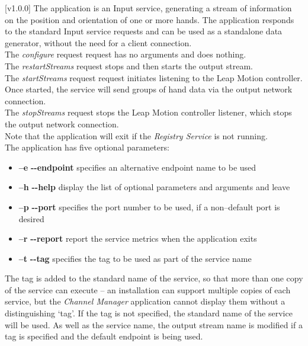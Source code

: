 [v1.0.0]
The  application is an Input service,
generating a stream of information on the position and orientation of one or more hands.
The application responds to the standard Input service requests and can be used as a
standalone data generator, without the need for a client connection.\\

The \emph{configure} request request has no arguments and does nothing.\\

The \emph{restartStreams} request stops and then starts the output stream.\\

The \emph{startStreams} request request initiates listening to the Leap Motion controller.
Once started, the service will send groups of hand data via the output \yarp{} network
connection.\\

The \emph{stopStreams} request stops the Leap Motion controller listener, which stops the
output \yarp{} network connection.\\ 

Note that the application will exit if the \emph{Registry Service} is not running.\\

The application has five optional parameters:
\begin{itemize}
\item \textbf{--e} \textbar{} \textbf{{-}{-}endpoint} specifies an alternative endpoint
name to be used
\item \textbf{--h} \textbar{} \textbf{{-}{-}help} display the list of optional parameters
and arguments and leave
\item \textbf{--p} \textbar{} \textbf{{-}{-}port} specifies the port number to be used, if
a non--default port is desired
\item \textbf{--r} \textbar{} \textbf{{-}{-}report} report the service metrics when the
application exits
\item \textbf{--t} \textbar{} \textbf{{-}{-}tag} specifies the tag to be used as part of
the service name
\end{itemize}
The tag is added to the standard name of the service, so that more than one copy of the
service can execute -- an \mplusm{} installation can support multiple copies of each
 service, but the \emph{Channel Manager} application cannot display them
without a distinguishing `tag'.
If the tag is not specified, the standard name of the service will be used.
As well as the service name, the output stream name is modified if a tag is specified and
the default endpoint is being used.\\

